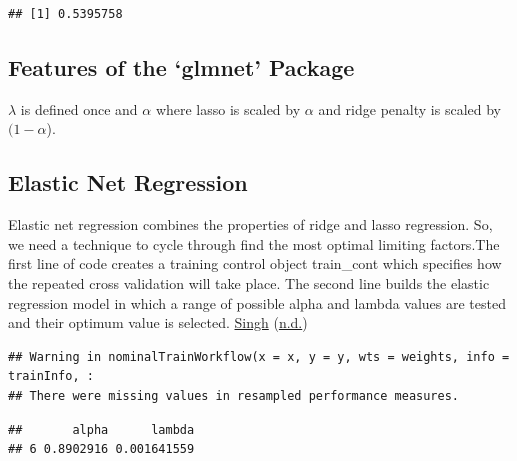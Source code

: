 \documentclass[
]{book}
\newenvironment{Shaded}{\begin{snugshade}}{\end{snugshade}}
\newcommand{\AttributeTok}[1]{\textcolor[rgb]{0.77,0.63,0.00}{#1}}
\newcommand{\CommentTok}[1]{\textcolor[rgb]{0.56,0.35,0.01}{\textit{#1}}}
\newcommand{\DecValTok}[1]{\textcolor[rgb]{0.00,0.00,0.81}{#1}}
\newcommand{\FunctionTok}[1]{\textcolor[rgb]{0.00,0.00,0.00}{#1}}
\newcommand{\NormalTok}[1]{#1}
\newcommand{\OtherTok}[1]{\textcolor[rgb]{0.56,0.35,0.01}{#1}}
\newcommand{\SpecialCharTok}[1]{\textcolor[rgb]{0.00,0.00,0.00}{#1}}
\begin{document}
\begin{verbatim}
## [1] 0.5395758
\end{verbatim}

\hypertarget{features-of-the-glmnet-package}{%
\subsection{Features of the `glmnet' Package}\label{features-of-the-glmnet-package}}

\(\lambda\) is defined once and \(\alpha\) where lasso is scaled by \(\alpha\) and ridge penalty is scaled by \((1-\alpha\)).

\hypertarget{elastic-net-regression}{%
\subsection{Elastic Net Regression}\label{elastic-net-regression}}

Elastic net regression combines the properties of ridge and lasso regression. So, we need a technique to cycle through find the most optimal limiting factors.The first line of code creates a training control object train\_cont which specifies how the repeated cross validation will take place. The second line builds the elastic regression model in which a range of possible alpha and lambda values are tested and their optimum value is selected. \protect\hyperlink{ref-regression_r}{Singh} (\protect\hyperlink{ref-regression_r}{n.d.})

\begin{verbatim}
## Warning in nominalTrainWorkflow(x = x, y = y, wts = weights, info = trainInfo, :
## There were missing values in resampled performance measures.
\end{verbatim}

\begin{Shaded}
\end{Shaded}

\begin{verbatim}
##       alpha      lambda
## 6 0.8902916 0.001641559
\end{verbatim}

\begin{Shaded}
\end{Shaded}
\end{document}
